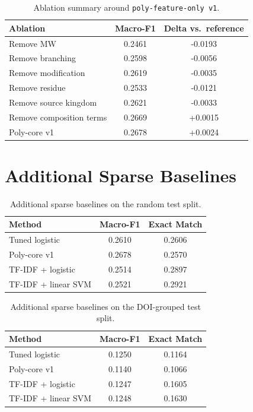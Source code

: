 \documentclass{article}
\begin{document}
\begin{table}[h]
\centering
\caption{Ablation summary around \texttt{poly-feature-only v1}.}
\begin{tabular}{lcc}
\toprule
Ablation & Macro-F1 & Delta vs.\ reference \\
\midrule
Remove MW & 0.2461 & -0.0193 \\
Remove branching & 0.2598 & -0.0056 \\
Remove modification & 0.2619 & -0.0035 \\
Remove residue & 0.2533 & -0.0121 \\
Remove source kingdom & 0.2621 & -0.0033 \\
Remove composition terms & 0.2669 & +0.0015 \\
Poly-core v1 & 0.2678 & +0.0024 \\
\bottomrule
\end{tabular}
\end{table}

\section{Additional Sparse Baselines}

\begin{table}[h]
\centering
\caption{Additional sparse baselines on the random test split.}
\begin{tabular}{lcc}
\toprule
Method & Macro-F1 & Exact Match \\
\midrule
Tuned logistic & 0.2610 & 0.2606 \\
Poly-core v1 & 0.2678 & 0.2570 \\
TF-IDF + logistic & 0.2514 & 0.2897 \\
TF-IDF + linear SVM & 0.2521 & 0.2921 \\
\bottomrule
\end{tabular}
\end{table}

\begin{table}[h]
\centering
\caption{Additional sparse baselines on the DOI-grouped test split.}
\begin{tabular}{lcc}
\toprule
Method & Macro-F1 & Exact Match \\
\midrule
Tuned logistic & 0.1250 & 0.1164 \\
Poly-core v1 & 0.1140 & 0.1066 \\
TF-IDF + logistic & 0.1247 & 0.1605 \\
TF-IDF + linear SVM & 0.1248 & 0.1630 \\
\bottomrule
\end{tabular}
\end{table}
\end{document}
